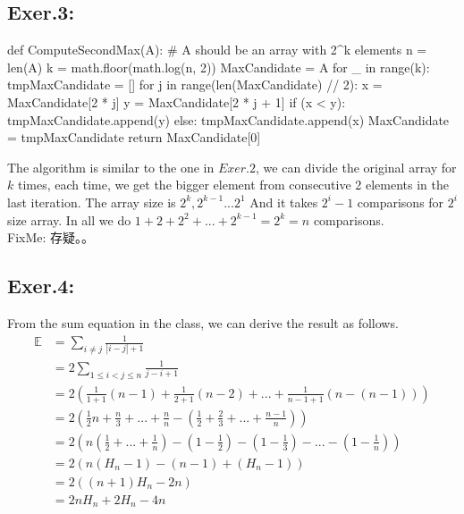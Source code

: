 \documentclass[UTF8]{ctexart}
\begin{document}
\subsection*{Exer.3:}
\begin{python}
    def ComputeSecondMax(A):
        # A should be an array with 2^k elements
        n = len(A)
        k = math.floor(math.log(n, 2))
        MaxCandidate = A
        for _ in range(k):
            tmpMaxCandidate = []
            for j in range(len(MaxCandidate) // 2):
                x = MaxCandidate[2 * j]
                y = MaxCandidate[2 * j + 1]
                if (x < y):
                    tmpMaxCandidate.append(y)
                else:
                    tmpMaxCandidate.append(x)
            MaxCandidate = tmpMaxCandidate
        return MaxCandidate[0]
\end{python}
    The algorithm is similar to the one in $Exer.2$, we can divide the original array for $k$ times, each time, we 
    get the bigger element from consecutive 2 elements in the last iteration. The array size is $2^k, 2^{k - 1}...2^{1}$
    And it takes $2^i - 1$ comparisons for $2^i$ size array.
    In all we do $1 + 2 + 2^2 +... + 2^{k - 1} = 2^k = n$ comparisons.\\
    FixMe: 存疑。。

\subsection*{Exer.4:}
    From the sum equation in the class, we can derive the result as follows.
\begin{align*}
    \mathbb{E}  & = \sum_{i \neq j} \frac{1}{|i - j| + 1}\\
                & = 2\sum_{1 \leq i < j \leq n} \frac{1}{j - i + 1}\\
                & = 2(\frac{1}{1 + 1}(n - 1) + \frac{1}{2 + 1}(n - 2) + ... + \frac{1}{n - 1 + 1}(n - (n - 1)))\\
                & = 2(\frac{1}{2}n + \frac{n}{3} + ... + \frac{n}{n} - (\frac{1}{2} + \frac{2}{3} + ... + \frac{n - 1}{n}))\\
                & = 2(n(\frac{1}{2} + ... + \frac{1}{n}) - (1 - \frac{1}{2}) - (1 - \frac{1}{3}) -... - (1 - \frac{1}{n}))\\
                & = 2(n(H_n - 1) - (n - 1) + (H_n -1))\\
                & = 2((n + 1)H_n - 2n)\\
                & = 2nH_n + 2H_n - 4n
\end{align*}
\end{document}
